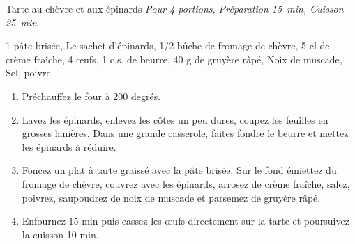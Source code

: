 \begin{recette}{Tarte au chèvre et aux épinards}
  \emph{Pour 4 portions,	Préparation 15~min,	Cuisson 25~min}
  \begin{ingredients}
    1 pâte brisée\sep
    Le sachet d’épinards\sep
    1/2 bûche de fromage de chèvre\sep
    5 cl de crème fraîche\sep
    4 œufs\sep
    1 c.s. de beurre\sep
    40 g de gruyère râpé\sep
    Noix de muscade\sep
    Sel, poivre
  \end{ingredients}
	\begin{enumerate}
	\item Préchauffez le four à 200 degrés.
  \item Lavez les épinards, enlevez les côtes un peu dures, coupez les feuilles en grosses lanières. Dans une grande casserole, faites fondre le beurre et mettez les épinards à réduire.
  \item Foncez un plat à tarte graissé avec la pâte brisée. Sur le fond émiettez du fromage de chèvre, couvrez avec les épinards, arrosez de crème fraîche, salez, poivrez, saupoudrez de noix de muscade et parsemez de gruyère râpé.
  \item Enfournez 15 min puis cassez les œufs directement sur la tarte et poursuivez la cuisson 10 min.
  \end{enumerate}
\end{recette}
